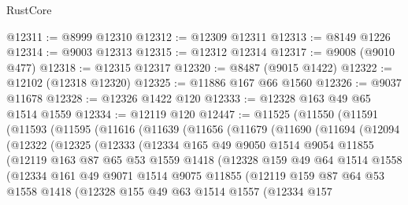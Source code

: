 \begin{lexlean}{RustCore}
\begin{coremodule}
@12311 := @8999 @12310
@12312 := @12309 @12311
@12313 := @8149 @1226
@12314 := @9003 @12313
@12315 := @12312 @12314
@12317 := @9008 (@9010 @477)
@12318 := @12315 @12317
@12320 := @8487 (@9015 @1422)
@12322 := @12102 (@12318 @12320)
@12325 := @11886 @167 @66 @1560
@12326 := @9037 @11678
@12328 := @12326 @1422 @120
@12333 := @12328 @163 @49 @65 @1514 @1559
@12334 := @12119 @120
@12447 := @11525
    (@11550
      (@11591
        (@11593
          (@11595
            (@11616
              (@11639
                (@11656
                  (@11679
                    (@11690
                      (@11694
                        (@12094
                          (@12322
                            (@12325
                              (@12333
                                (@12334
                                  @165
                                  @49
                                  @9050
                                  @1514
                                  @9054
                                  @11855
                                  (@12119
                                    @163
                                    @87
                                    @65
                                    @53
                                    @1559
                                    @1418
                                    (@12328
                                      @159
                                      @49
                                      @64
                                      @1514
                                      @1558
                                      (@12334
                                        @161
                                        @49
                                        @9071
                                        @1514
                                        @9075
                                        @11855
                                        (@12119
                                          @159
                                          @87
                                          @64
                                          @53
                                          @1558
                                          @1418
                                          (@12328
                                            @155
                                            @49
                                            @63
                                            @1514
                                            @1557
                                            (@12334
                                              @157

\end{coremodule}
\end{lexlean}
